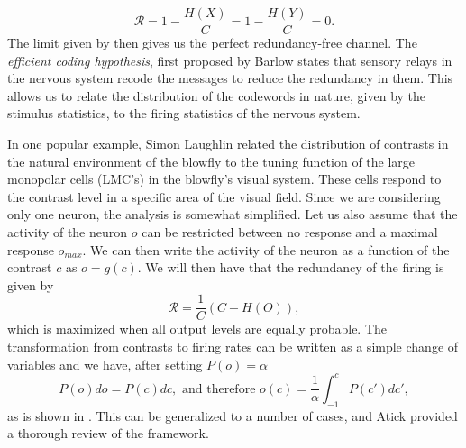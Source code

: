 $$
\mathcal{R} = 1 - \frac{H(X)}{C}= 1 - \frac{H(Y)}{C} = 0.
$$
The limit given by  then gives us the perfect redundancy-free channel. The {\em efficient coding hypothesis}, first proposed by Barlow\cite{Barlow1961} states that sensory relays in the nervous system recode the	messages to reduce the redundancy in them. This allows us to relate the distribution of the codewords in nature, given by the stimulus statistics, to the firing statistics of the nervous system.\par
In one popular example, Simon Laughlin related the distribution of contrasts in the natural environment of the blowfly to the tuning function of the large monopolar cells (LMC's) in the blowfly's visual system.\cite{Laughlin1981} These cells respond to the contrast level in a specific area of the visual field.
Since we are considering only one neuron, the analysis is somewhat simplified. Let us also assume that the activity of the neuron $o$ can be restricted between no response and a maximal response $o_{max}$. We can then write the activity of the neuron as a function of the contrast $c$ as $o = g(c)$. We will then have that the redundancy of the firing is given by
$$
\mathcal{R} = \frac{1}{C} \left(C - H(O) \right),
$$
which is maximized when all output levels are equally probable.
The transformation from contrasts to firing rates can be written as a simple change of variables and we have, after setting $P(o) = \alpha$
$$
P(o) do = P(c) dc, \textrm{ and therefore } o(c) = \frac{1}{\alpha} \int_{-1}^c P(c') dc',
$$
as is shown in . This can be generalized to a number of cases, and Atick\cite{Atick1992} provided a thorough review of the framework.\par

